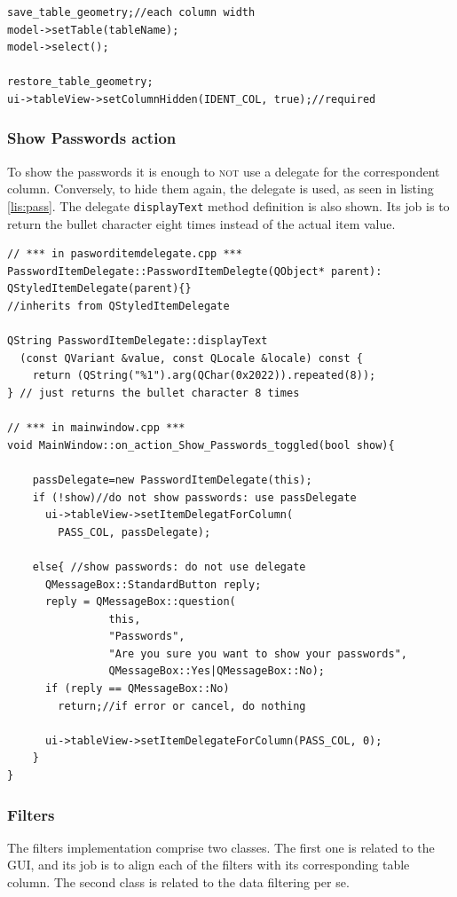 \begin{lstlisting}[style=customc, float=htb, caption={update the model/view}, label = {lis:updatemv}]
save_table_geometry;//each column width
model->setTable(tableName);
model->select();
    
restore_table_geometry;
ui->tableView->setColumnHidden(IDENT_COL, true);//required
\end{lstlisting}

\subsubsection*{Show Passwords action}

To show the passwords it is enough to \textsc{not} use a delegate for the correspondent column. Conversely, to hide them again, the delegate is used, as seen in listing \ref{lis:pass}. The delegate \texttt{displayText} method definition is also shown. Its job is to return the bullet character eight times instead of the actual item value.

\begin{lstlisting}[style=customc, float=htb, caption={Show/Hide Passwords}, label = {lis:pass}]
// *** in pasworditemdelegate.cpp ***
PasswordItemDelegate::PasswordItemDelegte(QObject* parent): QStyledItemDelegate(parent){}
//inherits from QStyledItemDelegate

QString PasswordItemDelegate::displayText
  (const QVariant &value, const QLocale &locale) const {
    return (QString("%1").arg(QChar(0x2022)).repeated(8));
} // just returns the bullet character 8 times

// *** in mainwindow.cpp ***
void MainWindow::on_action_Show_Passwords_toggled(bool show){

	passDelegate=new PasswordItemDelegate(this);
	if (!show)//do not show passwords: use passDelegate
	  ui->tableView->setItemDelegatForColumn(
	    PASS_COL, passDelegate);
	 
	else{ //show passwords: do not use delegate
	  QMessageBox::StandardButton reply;
	  reply = QMessageBox::question(
	            this,
	            "Passwords",
	            "Are you sure you want to show your passwords",
	            QMessageBox::Yes|QMessageBox::No);
	  if (reply == QMessageBox::No)
	    return;//if error or cancel, do nothing
	
	  ui->tableView->setItemDelegateForColumn(PASS_COL, 0);
	}
}
\end{lstlisting}

\subsubsection*{Filters}
The filters implementation comprise two classes. The first one is related to the GUI, and its job is to align each of the filters with its corresponding table column. The second class is related to the data filtering per se.

